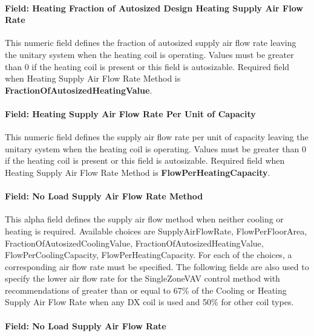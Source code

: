 \paragraph{Field: Heating Fraction of Autosized Design Heating Supply Air Flow Rate}\label{field-heating-fraction-of-autosized-design-heating-supply-air-flow-rate}

This numeric field defines the fraction of autosized supply air flow rate leaving the unitary system when the heating coil is operating. Values must be greater than 0 if the heating coil is present or this field is autosizable. Required field when Heating Supply Air Flow Rate Method is \textbf{FractionOfAutosizedHeatingValue}.

\paragraph{Field: Heating Supply Air Flow Rate Per Unit of Capacity}\label{field-heating-supply-air-flow-rate-per-unit-of-capacity}

This numeric field defines the supply air flow rate per unit of capacity leaving the unitary system when the heating coil is operating. Values must be greater than 0 if the heating coil is present or this field is autosizable. Required field when Heating Supply Air Flow Rate Method is \textbf{FlowPerHeatingCapacity}.

\paragraph{Field: No Load Supply Air Flow Rate Method}\label{field-no-load-supply-air-flow-rate-method}

This alpha field defines the supply air flow method when neither cooling or heating is required. Available choices are SupplyAirFlowRate, FlowPerFloorArea, FractionOfAutosizedCoolingValue, FractionOfAutosizedHeatingValue, FlowPerCoolingCapacity, FlowPerHeatingCapacity. For each of the choices, a corresponding air flow rate must be specified. The following fields are also used to specify the lower air flow rate for the SingleZoneVAV control method with recommendations of greater than or equal to 67\% of the Cooling or Heating Supply Air Flow Rate when any DX coil is used and 50\% for other coil types.

\paragraph{Field: No Load Supply Air Flow Rate}\label{field-no-load-supply-air-flow-rate-000}

